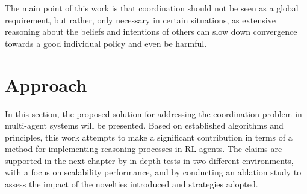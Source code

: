 \documentclass[a4paper,singleside,12pt]{report} %
\begin{document}
The main point of this work is that coordination should not be seen as a global requirement, but rather, only necessary in certain situations, as extensive reasoning about the beliefs and intentions of others can slow down convergence towards a good individual policy and even be harmful.

\chapter{Approach}\label{approach}

In this section, the proposed solution for addressing the coordination problem in multi-agent systems will be presented. Based on established algorithms and principles, this work attempts to make a significant contribution in terms of a method for implementing reasoning processes in RL agents. The claims are supported in the next chapter by in-depth tests in two different environments, with a focus on scalability performance, and by conducting an ablation study to assess the impact of the novelties introduced and strategies adopted.
\end{document}
